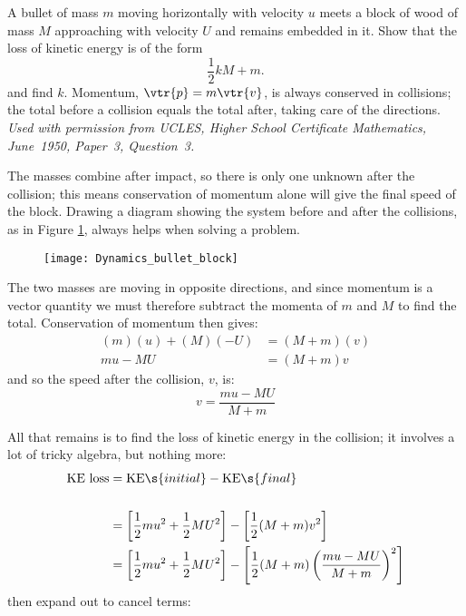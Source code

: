 

\begin{hint}
{A bullet of mass $m$ moving horizontally with velocity $u$ meets a block of wood of mass $M$ approaching with velocity $U$ and remains embedded in it.  Show that the loss of kinetic energy is of the form 
\begin{equation*}
 \frac{1}{2} k {M+m}.
\end{equation*}
and find $k$.
} 
{Momentum, $\vtr{p} = m\vtr{v}$, is always conserved in collisions; the total before a collision equals the total after, taking care of the directions.} 
{\textit{Used with permission from UCLES, Higher School Certificate Mathematics, June~1950, Paper~3, Question~3.}}
{The masses combine after impact, so there is only one unknown after the collision; this means conservation of momentum alone will give the final speed of the block. Drawing a diagram showing the system before and after the collisions, as in Figure \ref{fig:Dynamics_bullet_block}, always helps when solving a problem.

\begin{figure}[h]
	\centering
	\texttt{[image: Dynamics\_bullet\_block]}
	\caption{}
	\label{fig:Dynamics_bullet_block}
\end{figure}

The two masses are moving in opposite directions, and since momentum is a vector quantity we must therefore subtract the momenta of $m$ and $M$ to find the total. Conservation of momentum then gives:
	\begin{align*} (m)(u) + (M)(-U) &= (M + m)(v) \\ mu - MU &= (M + m)v\end{align*}
and so the speed after the collision, $v$, is:
	\begin{equation*} v = \frac{mu - MU}{M + m} \end{equation*}

All that remains is to find the loss of kinetic energy in the collision; it involves a lot of tricky algebra, but nothing more:
\begin{align*} \textrm{KE loss} &= \textrm{KE}\s{initial} - \textrm{KE}\s{final} \\ \\
	&= \left[\frac{1}{2}mu^{2} + \frac{1}{2}MU^{2}\right] - \left[\frac{1}{2}(M + m)v^{2}\right] \\
	 &=  \left[\frac{1}{2}mu^{2} + \frac{1}{2}MU^{2}\right] - \left[\frac{1}{2}(M + m)\left(\frac{mu - MU}{M + m}\right)^{2}\right]
\end{align*} then expand out to cancel terms:

}
\end{hint}

